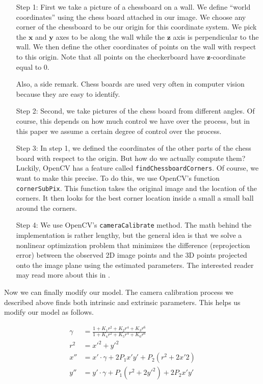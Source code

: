 \documentclass{article}
\def\code#1{\texttt{#1}}
\begin{document}
\begin{itemize}
    \item [Step 1: ] First we take a picture of a chessboard on a wall. We define ``world coordinates'' using the chess board attached in our image. We choose any corner of the chessboard to be our origin for this coordinate system. We pick the $\mathbf{x}$ and $\mathbf{y}$ axes to be along the wall while the $\mathbf{z}$ axis is perpendicular to the wall.  We then define the other coordinates of points on the wall with respect to this origin. Note that all points on the checkerboard have $\mathbf{z}$-coordinate equal to 0.

    Also, a side remark. Chess boards are used very often in computer vision because they are easy to identify. 
    \item [Step 2: ] Second, we take pictures of the chess board from different angles. Of course, this depends on how much control we have over the process, but in this paper we assume a certain degree of control over the process. 
    \item [Step 3: ] In step 1, we defined the coordinates of the other parts of the chess board with respect to the origin. But how do we actually compute them? Luckily, OpenCV has a feature called \code{findChessboardCorners}. Of course, we want to make this precise. To do this, we use OpenCV's function \code{cornerSubPix}. This function takes the original image and the location of the corners. It then looks for the best corner location inside a small a small ball around the corners.
    \item [Step 4: ] We use OpenCV's \code{cameraCalibrate} method. The math behind the implementation is rather lengthy, but the general idea is that we solve a nonlinear optimization problem that minimizes the difference (reprojection error) between the observed 2D image points and the 3D points projected onto the image plane using the estimated parameters. The interested reader may read more about this in \cite{zhangmethod}.
\end{itemize}

Now we can finally modify our model. The camera calibration process we described above finds both intrinsic and extrinsic parameters. This helps us modify our model as follows.

\begin{align*}
    \gamma &= \frac{1 + K_1r^2 + K_2r^4 + K_3r^6}{1+K_4r^2 + K_5r^4 + K_6r^6} \\
    r^2 &= x'^2 + y'^2 \\
    x'' &= x'\cdot\gamma + 2P_1x'y' + P_2(r^2+2x'2) \\
    y'' &= y'\cdot\gamma + P_1(r^2 + 2y'^2) + 2P_2x'y' \\
\end{align*}
\end{document}
